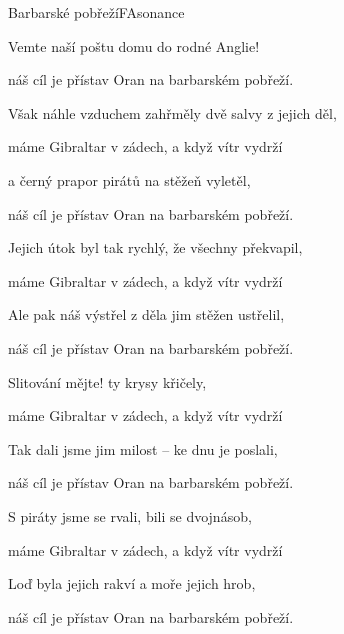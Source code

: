 \begin{song}{Barbarské pobřeží}{F}{Asonance}
\begin{SBVerse}
Vemte naší poštu domu do rodné Anglie!

náš cíl je přístav Oran na barbarském pobřeží.

\end{SBVerse}

\begin{SBVerse}

Však náhle vzduchem zahřměly dvě salvy z jejich děl,

máme Gibraltar v zádech, a když vítr vydrží

a černý prapor pirátů na stěžeň vyletěl,

náš cíl je přístav Oran na barbarském pobřeží.

\end{SBVerse}

\begin{SBVerse}

Jejich útok byl tak rychlý, že všechny překvapil,

máme Gibraltar v zádech, a když vítr vydrží

Ale pak náš výstřel z děla jim stěžen ustřelil,

náš cíl je přístav Oran na barbarském pobřeží.

\end{SBVerse}

\begin{SBVerse}

Slitování mějte! ty krysy křičely,

máme Gibraltar v zádech, a když vítr vydrží

Tak dali jsme jim milost – ke dnu je poslali,

náš cíl je přístav Oran na barbarském pobřeží.

\end{SBVerse}

\begin{SBVerse}

S piráty jsme se rvali, bili se dvojnásob,

máme Gibraltar v zádech, a když vítr vydrží

Loď byla jejich rakví a moře jejich hrob,

náš cíl je přístav Oran na barbarském pobřeží.

\end{SBVerse}

\end{song}

\clearpage
